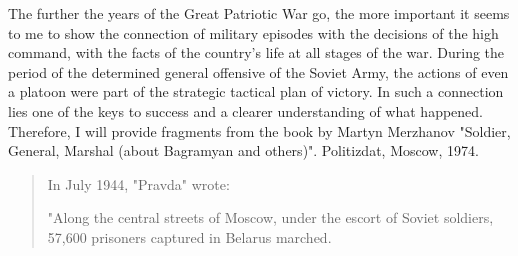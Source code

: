 \sloppy
{
The further the years of the Great Patriotic War go, the more important it seems to me to show the connection of military episodes with the decisions of the high command, with the facts of the country's life at all stages of the war. During the period of the determined general offensive of the Soviet Army, the actions of even a platoon were part of the strategic tactical plan of victory. In such a connection lies one of the keys to success and a clearer understanding of what happened. Therefore, I will provide fragments from the book by Martyn Merzhanov "Soldier, General, Marshal (about Bagramyan and others)". Politizdat, Moscow, 1974.}

\begin{quote}
{
In July 1944, "Pravda" wrote:}

{
"Along the central streets of Moscow, under the escort of Soviet soldiers, 57,600 prisoners captured in Belarus marched.}
\end{quote}

